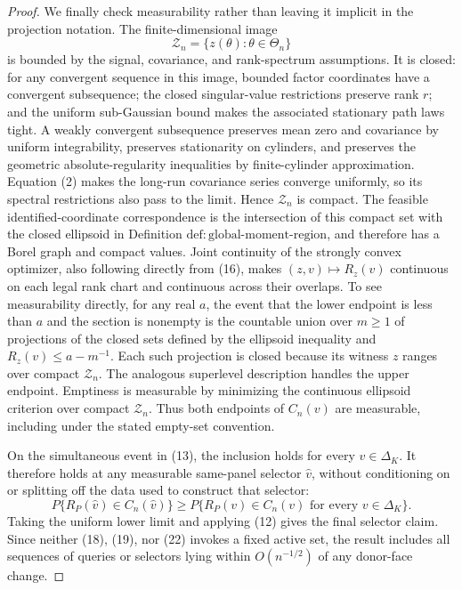 \documentclass{article}
\begin{document}
\begin{proof}
We finally check measurability rather than leaving it implicit in the projection notation.  The finite-dimensional image
\[
\mathcal Z_n=\{z(\theta):\theta\in\Theta_n\}
\]
is bounded by the signal, covariance, and rank-spectrum assumptions.  It is closed: for any convergent sequence in this image, bounded factor coordinates have a convergent subsequence; the closed singular-value restrictions preserve rank \(r\); and the uniform sub-Gaussian bound makes the associated stationary path laws tight.  A weakly convergent subsequence preserves mean zero and covariance by uniform integrability, preserves stationarity on cylinders, and preserves the geometric absolute-regularity inequalities by finite-cylinder approximation.  Equation (2) makes the long-run covariance series converge uniformly, so its spectral restrictions also pass to the limit.  Hence \(\mathcal Z_n\) is compact.  The feasible identified-coordinate correspondence is the intersection of this compact set with the closed ellipsoid in Definition \(\mathrm{def:global\mbox{-}moment\mbox{-}region}\), and therefore has a Borel graph and compact values.  Joint continuity of the strongly convex optimizer, also following directly from (16), makes \((z,v)\mapsto R_z(v)\) continuous on each legal rank chart and continuous across their overlaps.  To see measurability directly, for any real \(a\), the event that the lower endpoint is less than \(a\) and the section is nonempty is the countable union over \(m\geq1\) of projections of the closed sets defined by the ellipsoid inequality and \(R_z(v)\leq a-m^{-1}\).  Each such projection is closed because its witness \(z\) ranges over compact \(\mathcal Z_n\).  The analogous superlevel description handles the upper endpoint.  Emptiness is measurable by minimizing the continuous ellipsoid criterion over compact \(\mathcal Z_n\).  Thus both endpoints of \(C_n(v)\) are measurable, including under the stated empty-set convention.

On the simultaneous event in (13), the inclusion holds for every \(v\in\Delta_K\).  It therefore holds at any measurable same-panel selector \(\widehat v\), without conditioning on or splitting off the data used to construct that selector:
\[
P\{R_P(\widehat v)\in C_n(\widehat v)\}
\geq
P\{R_P(v)\in C_n(v)\text{ for every }v\in\Delta_K\}.
\]
Taking the uniform lower limit and applying (12) gives the final selector claim.  Since neither (18), (19), nor (22) invokes a fixed active set, the result includes all sequences of queries or selectors lying within \(O(n^{-1/2})\) of any donor-face change.
\end{proof}
\end{document}
